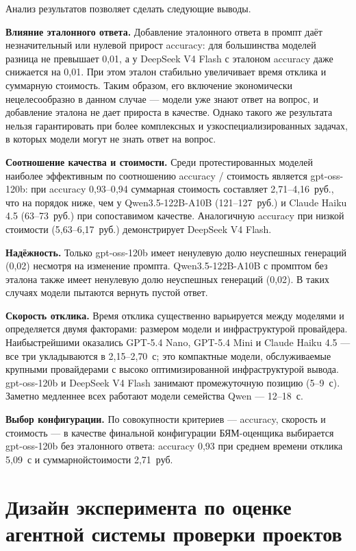 Анализ результатов позволяет сделать следующие выводы.

\textbf{Влияние эталонного ответа.} Добавление эталонного ответа в промпт
даёт незначительный или нулевой прирост accuracy: для большинства моделей
разница не превышает 0{,}01, а у DeepSeek V4 Flash с эталоном accuracy
даже снижается на 0{,}01. При этом эталон стабильно увеличивает время
отклика и суммарную стоимость. Таким образом, его включение экономически
нецелесообразно в данном случае --- модели уже знают ответ на вопрос, и добавление эталона не дает прироста в качестве.
Однако такого же результата нельзя гарантировать при более комплексных и узкоспециализированных задачах, в которых
модели могут не знать ответ на вопрос.

\textbf{Соотношение качества и стоимости.} Среди протестированных моделей
наиболее эффективным по соотношению accuracy / стоимость является
gpt-oss-120b: при accuracy 0{,}93--0{,}94 суммарная стоимость
составляет 2{,}71--4{,}16~руб., что на порядок ниже, чем у Qwen3.5-122B-A10B
(121--127~руб.) и Claude Haiku 4.5 (63--73~руб.) при сопоставимом качестве.
Аналогичную accuracy при низкой стоимости (5{,}63--6{,}17~руб.) демонстрирует
DeepSeek V4 Flash.

\textbf{Надёжность.} Только gpt-oss-120b имеет ненулевую долю неуспешных
генераций (0{,}02) несмотря на изменение промпта. Qwen3.5-122B-A10B с промптом без эталона
также имеет ненулевую долю неуспешных генераций (0{,}02). В таких случаях модели
пытаются вернуть пустой ответ.

\textbf{Скорость отклика.} Время отклика существенно варьируется между
моделями и определяется двумя факторами: размером модели и инфраструктурой
провайдера. Наибыстрейшими оказались GPT-5.4 Nano,
GPT-5.4 Mini и Claude Haiku 4.5 --- все три укладываются
в 2{,}15--2{,}70~с; это компактные модели, обслуживаемые крупными
провайдерами с высоко оптимизированной инфраструктурой вывода.
gpt-oss-120b и DeepSeek V4 Flash занимают промежуточную
позицию (5--9~с). Заметно медленнее всех работают модели семейства
Qwen --- 12--18~с.

\textbf{Выбор конфигурации.} По совокупности критериев --- accuracy,
скорость и стоимость --- в качестве финальной конфигурации БЯМ-оценщика
выбирается gpt-oss-120b без эталонного ответа: accuracy 0{,}93
при среднем времени отклика 5{,}09~с и суммарнойстоимости 2{,}71~руб.

\section{Дизайн эксперимента по оценке агентной системы проверки
проектов}\label{sec:agent_eval_design}
 
